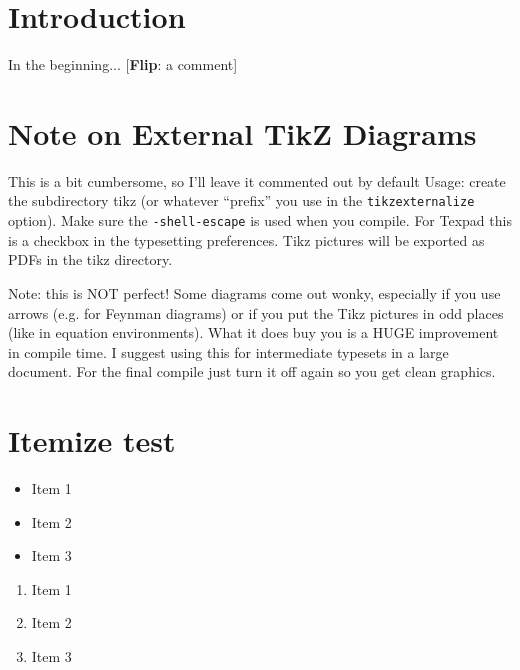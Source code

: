 \documentclass[12pt]{article}
\numberwithin{equation}{section}
\newcommand{\flip}[1]{{
	\color{green!50!black} \footnotesize [\textbf{\textsf{Flip}}: \textsf{#1}]
	}}
\begin{document}



\section{Introduction}

In the beginning... \flip{a comment}


\section{Note on External TikZ Diagrams}

 This is a bit cumbersome, so I'll leave it commented out by default
 Usage: create the subdirectory tikz (or whatever ``prefix'' you use in
 the \texttt{tikzexternalize} option). Make sure the \texttt{-shell-escape} 
 is used when you compile. 
 For Texpad this is a checkbox in the typesetting preferences.
 Tikz pictures will be exported as PDFs in the tikz directory.

 Note: this is NOT perfect! Some diagrams come out wonky, especially if you
 use arrows (e.g. for Feynman diagrams) or if you put the Tikz pictures in
 odd places (like in equation environments). What it does buy you is a HUGE
 improvement in compile time. I suggest using this for intermediate 
 typesets in a large document. For the final compile just turn it off again
 so you get clean graphics.
 
\section{Itemize test}

\begin{itemize}%
\item Item 1
\item Item 2
\item Item 3
\end{itemize}

\begin{enumerate}%
\item Item 1
\item Item 2
\item Item 3
\end{enumerate}
\end{document}
